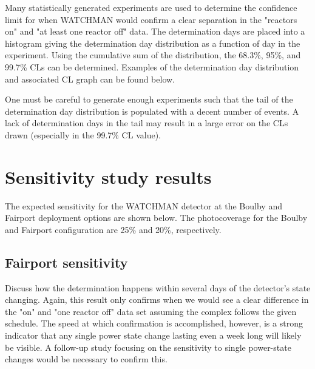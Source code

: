 \documentclass{article}
\begin{document}
Many statistically generated experiments are used to determine the
confidence limit for when WATCHMAN would confirm a clear separation in
 the "reactors on" and "at least one reactor off" data.  The determination
 days are placed into a histogram giving the determination day distribution
 as a function of day in the experiment.  Using the cumulative sum of the
 distribution, the 68.3\%, 95\%, and 99.7\% CLs can be determined. Examples
 of the determination day distribution and associated CL graph can be
 found below.


 One must be careful to generate enough experiments such that the tail of
 the determination day distribution is populated with a decent number of
 events.  A lack of determination days in the tail may result in a large
 error on the CLs drawn (especially in the 99.7\% CL value).

\section{Sensitivity study results}

The expected sensitivity for the WATCHMAN detector at the Boulby and Fairport
deployment options are shown below.  The photocoverage for the Boulby and
Fairport configuration are 25\% and 20\%, respectively.

\subsection{Fairport sensitivity}
Discuss how the determination happens within several days of the detector's
state changing.  Again, this result only confirms when we would see a clear
difference in the "on" and "one reactor off" data set assuming the complex
follows the given schedule.  The speed at which confirmation is accomplished,
however, is a strong indicator that any single power state change lasting
even a week long will likely be visible.  A follow-up study focusing on the
sensitivity to single power-state changes would be necessary to confirm this.

\


\end{document}
